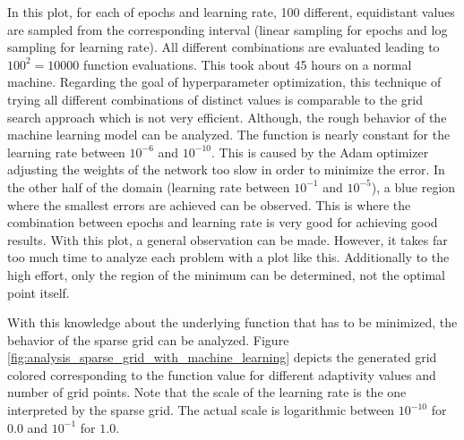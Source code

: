 In this plot, for each of epochs and learning rate, 100 different, equidistant values are sampled from the corresponding interval (linear sampling for epochs and log sampling for learning rate). All different combinations are evaluated leading to $ 100^2 = 10000 $ function evaluations. This took about 45 hours on a normal machine. Regarding the goal of hyperparameter optimization, this technique of trying all different combinations of distinct values is comparable to the grid search approach which is not very efficient. Although, the rough behavior of the machine learning model can be analyzed. The function is nearly constant for the learning rate between $ 10^{-6} $ and $ 10^{-10} $. This is caused by the Adam optimizer adjusting the weights of the network too slow in order to minimize the error. In the other half of the domain (learning rate between $ 10^{-1} $ and $ 10^{-5} $), a blue region where the smallest errors are achieved can be observed. This is where the combination between epochs and learning rate is very good for achieving good results. With this plot, a general observation can be made. However, it takes far too much time to analyze each problem with a plot like this. Additionally to the high effort, only the region of the minimum can be determined, not the optimal point itself. \newline

With this knowledge about the underlying function that has to be minimized, the behavior of the sparse grid can be analyzed. Figure \ref{fig:analysis_sparse_grid_with_machine_learning} depicts the generated grid colored corresponding to the function value for different adaptivity values and number of grid points. Note that the scale of the learning rate is the one interpreted by the sparse grid. The actual scale is logarithmic between $ 10^{-10} $ for $ 0.0 $ and $ 10 ^{-1} $ for $ 1.0 $. 


